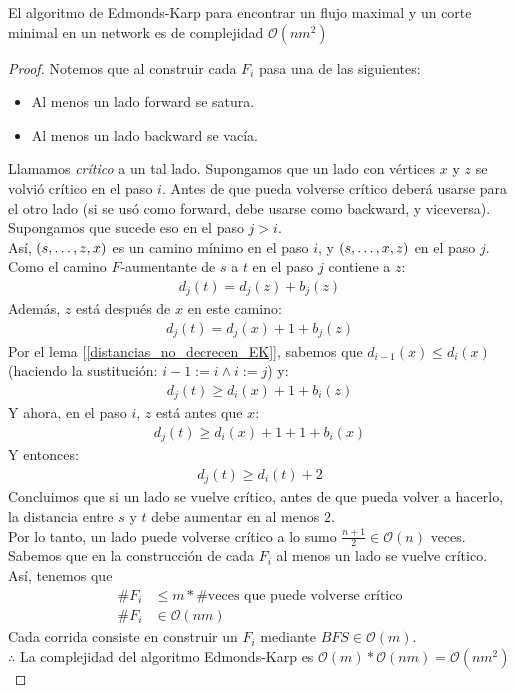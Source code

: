 \begin{theorem} 
El algoritmo de Edmonds-Karp para encontrar un flujo maximal y un corte minimal en un network es de complejidad $\mathcal{O}(n m^2)$
\end{theorem}
\begin{proof}
Notemos que al construir cada $F_i$ pasa una de las siguientes:
\begin{itemize}
    \item Al menos un lado forward se satura.
    \item Al menos un lado backward se vacía.
\end{itemize}
Llamamos \emph{crítico} a un tal lado.
Supongamos que un lado con vértices $x$ y $z$ se volvió crítico en el paso $i$. Antes de que pueda volverse crítico deberá usarse para el otro lado (si se usó como forward, debe usarse como backward, y viceversa). Supongamos que sucede eso en el paso $j > i$.\\
Así, $(s, \mathellipsis, z, x)$ es un camino mínimo en el paso $i$, y $(s,\mathellipsis, x, z)$ en el paso $j$.
Como el camino $F$-aumentante de $s$ a $t$ en el paso $j$ contiene a $z$:
\begin{align}
    d_j(t) = d_j(z)+b_j(z)
    \end{align}
Además, $z$ está después de $x$ en este camino:
\begin{align}
    d_j(t) = d_j(x) + 1 + b_j(z)
\end{align}
Por el lema [\ref{distancias_no_decrecen_EK}], sabemos que $d_{i-1}(x) \le d_i(x)$ (haciendo la sustitución: $i-1 := i \wedge i := j$) y:\begin{align}
    d_j(t) \ge d_i(x) + 1 + b_i(z)
\end{align}
Y ahora, en el paso $i$, $z$ está antes que $x$:
\begin{align}
    d_j(t) \ge d_i(x) + 1 + 1 + b_i(x)
\end{align}
Y entonces:
\begin{align}
    d_j(t) \ge d_i(t) + 2
\end{align}
Concluimos que si un lado se vuelve crítico, antes de que pueda volver a hacerlo, la distancia entre $s$ y $t$ debe aumentar en al menos $2$.\\
Por lo tanto, un lado puede volverse crítico a lo sumo $\frac{n+1}{2} \in \mathcal{O}(n)$ veces.
Sabemos que en la construcción de cada $F_i$ al menos un lado se vuelve crítico. Así, tenemos que \begin{align}
    \# F_i &\le m * \# \text{veces que puede volverse crítico}\\
    \# F_i &\in \mathcal{O}(nm)
\end{align}
Cada corrida consiste en construir un $F_i$ mediante $BFS \in \mathcal{O}(m)$.\\
 $\therefore$ La complejidad del algoritmo Edmonds-Karp es $\mathcal{O}(m) * \mathcal{O}(nm) = \mathcal{O}(nm^2)$
\end{proof}

